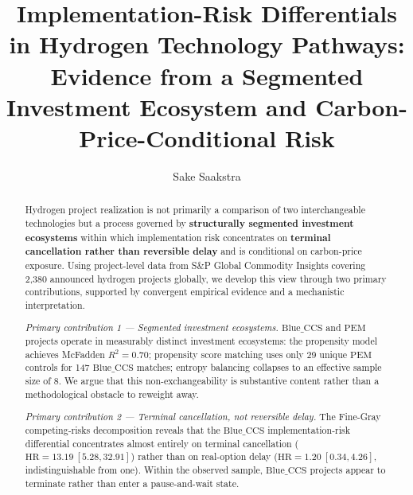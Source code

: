 \documentclass[review,authoryear,11pt]{elsarticle}
\newcommand{\HR}{\mathrm{HR}}
\newcommand{\BlueCCS}{\mathrm{Blue\_CCS}}
\newcommand{\PEM}{\mathrm{PEM}}
\begin{document}
\begin{frontmatter}

\title{Implementation-Risk Differentials in Hydrogen Technology Pathways:\\
Evidence from a Segmented Investment Ecosystem and Carbon-Price-Conditional Risk}

\author[vu,gas]{Sake Saakstra}



\begin{abstract}
\noindent Hydrogen project realization is not primarily a comparison of two interchangeable technologies but a process governed by \textbf{structurally segmented investment ecosystems} within which implementation risk concentrates on \textbf{terminal cancellation rather than reversible delay} and is conditional on carbon-price exposure. Using project-level data from S\&P Global Commodity Insights covering 2,380 announced hydrogen projects globally, we develop this view through two primary contributions, supported by convergent empirical evidence and a mechanistic interpretation.

\smallskip\noindent\textit{Primary contribution 1 --- Segmented investment ecosystems.} $\BlueCCS$ and $\PEM$ projects operate in measurably distinct investment ecosystems: the propensity model achieves McFadden $R^2 = 0.70$; propensity score matching uses only 29 unique $\PEM$ controls for 147 $\BlueCCS$ matches; entropy balancing collapses to an effective sample size of 8. We argue that this non-exchangeability is substantive content rather than a methodological obstacle to reweight away.

\smallskip\noindent\textit{Primary contribution 2 --- Terminal cancellation, not reversible delay.} The Fine-Gray competing-risks decomposition reveals that the $\BlueCCS$ implementation-risk differential concentrates almost entirely on terminal cancellation ($\HR = 13.19\ [5.28, 32.91]$) rather than on real-option delay ($\HR = 1.20\ [0.34, 4.26]$, indistinguishable from one). Within the observed sample, $\BlueCCS$ projects appear to terminate rather than enter a pause-and-wait state.


\end{abstract}
\end{frontmatter}
\end{document}
